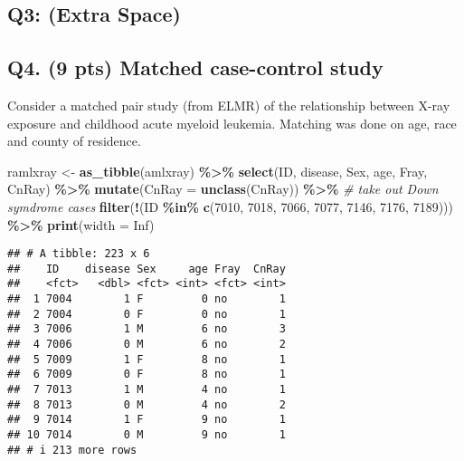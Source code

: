 \documentclass[
]{article}
\newenvironment{Shaded}{\begin{snugshade}}{\end{snugshade}}
\newcommand{\AttributeTok}[1]{\textcolor[rgb]{0.13,0.29,0.53}{#1}}
\newcommand{\CommentTok}[1]{\textcolor[rgb]{0.56,0.35,0.01}{\textit{#1}}}
\newcommand{\ConstantTok}[1]{\textcolor[rgb]{0.56,0.35,0.01}{#1}}
\newcommand{\DecValTok}[1]{\textcolor[rgb]{0.00,0.00,0.81}{#1}}
\newcommand{\FunctionTok}[1]{\textcolor[rgb]{0.13,0.29,0.53}{\textbf{#1}}}
\newcommand{\NormalTok}[1]{#1}
\newcommand{\OtherTok}[1]{\textcolor[rgb]{0.56,0.35,0.01}{#1}}
\newcommand{\SpecialCharTok}[1]{\textcolor[rgb]{0.81,0.36,0.00}{\textbf{#1}}}
\begin{document}
\newpage

\subsection{Q3: (Extra Space)}\label{q3-extra-space}

\newpage

\subsection{Q4. (9 pts) Matched case-control
study}\label{q4.-9-pts-matched-case-control-study}

Consider a matched pair study (from ELMR) of the relationship between
X-ray exposure and childhood acute myeloid leukemia. Matching was done
on age, race and county of residence.

\begin{Shaded}
\begin{Highlighting}[]
\NormalTok{ramlxray }\OtherTok{\textless{}{-}} \FunctionTok{as\_tibble}\NormalTok{(amlxray) }\SpecialCharTok{\%\textgreater{}\%}
  \FunctionTok{select}\NormalTok{(ID, disease, Sex, age, Fray, CnRay) }\SpecialCharTok{\%\textgreater{}\%}
  \FunctionTok{mutate}\NormalTok{(}\AttributeTok{CnRay =} \FunctionTok{unclass}\NormalTok{(CnRay)) }\SpecialCharTok{\%\textgreater{}\%}
  \CommentTok{\# take out Down symdrome cases}
  \FunctionTok{filter}\NormalTok{(}\SpecialCharTok{!}\NormalTok{(ID }\SpecialCharTok{\%in\%} \FunctionTok{c}\NormalTok{(}\DecValTok{7010}\NormalTok{, }\DecValTok{7018}\NormalTok{, }\DecValTok{7066}\NormalTok{, }\DecValTok{7077}\NormalTok{, }\DecValTok{7146}\NormalTok{, }\DecValTok{7176}\NormalTok{, }\DecValTok{7189}\NormalTok{))) }\SpecialCharTok{\%\textgreater{}\%}
  \FunctionTok{print}\NormalTok{(}\AttributeTok{width =} \ConstantTok{Inf}\NormalTok{)}
\end{Highlighting}
\end{Shaded}

\begin{verbatim}
## # A tibble: 223 x 6
##    ID    disease Sex     age Fray  CnRay
##    <fct>   <dbl> <fct> <int> <fct> <int>
##  1 7004        1 F         0 no        1
##  2 7004        0 F         0 no        1
##  3 7006        1 M         6 no        3
##  4 7006        0 M         6 no        2
##  5 7009        1 F         8 no        1
##  6 7009        0 F         8 no        1
##  7 7013        1 M         4 no        1
##  8 7013        0 M         4 no        2
##  9 7014        1 F         9 no        1
## 10 7014        0 M         9 no        1
## # i 213 more rows
\end{verbatim}
\end{document}
